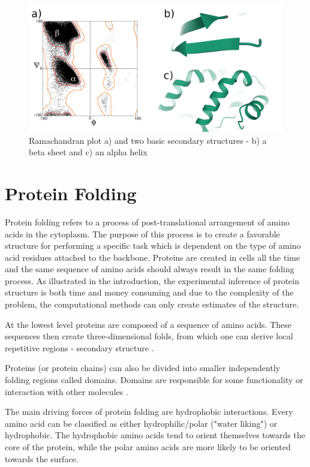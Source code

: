 \begin{figure}
    \centering
    \includegraphics[width=\linewidth]{imgs_tomas/secondary.png}
    \caption{Ramachandran plot \cite{ramachandran} a) and two basic secondary structures - b) a beta sheet and c) an alpha helix \cite{pdb}}
    \label{fig:ramachandran}
\end{figure}

\section{Protein Folding}

Protein folding refers to a process of post-translational arrangement of amino acids in the cytoplasm. 
The purpose of this process is to create a favorable structure for performing a specific task which is dependent on the type of amino acid residues attached to the backbone. 
Proteins are created in cells all the time and the same sequence of amino acids should always result in the same folding process. 
As illustrated in the introduction, the experimental inference of protein structure is both time and money consuming and due to the complexity of the problem, the computational methods can only create estimates of the structure.

At the lowest level proteins are composed of a sequence of amino acids. 
These sequences then create three-dimensional folds, from which one can derive local repetitive regions - secondary structure \cite{dill}. 

Proteins (or protein chains) can also be divided into smaller independently folding regions called domains. 
Domains are responsible for some functionality or interaction with other molecules \cite{domains}.

The main driving forces of protein folding are hydrophobic interactions. 
Every amino acid can be classified as either hydrophilic/polar ("water liking") or hydrophobic. 
The hydrophobic amino acids tend to orient themselves towards the core of the protein, while the polar amino acids are more likely to be oriented towards the surface.

